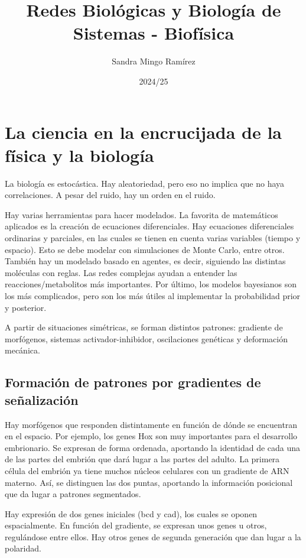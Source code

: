 \documentclass[nochap]{config/ejercicios}
\title{Redes Biológicas y Biología de Sistemas - Biofísica}
\author{Sandra Mingo Ramírez}
\date{2024/25}
\begin{document}
\maketitle

\tableofcontents

\newpage

\section{La ciencia en la encrucijada de la física y la biología}
La biología es estocástica. Hay aleatoriedad, pero eso no implica que no haya correlaciones. A pesar del ruido, hay un orden en el ruido. 

Hay varias herramientas para hacer modelados. La favorita de matemáticos aplicados es la creación de ecuaciones diferenciales. Hay ecuaciones diferenciales ordinarias y parciales, en las cuales se tienen en cuenta varias variables (tiempo y espacio). Esto se debe modelar con simulaciones de Monte Carlo, entre otros. También hay un modelado basado en agentes, es decir, siguiendo las distintas moléculas con reglas. Las redes complejas ayudan a entender las reacciones/metabolitos más importantes. Por último, los modelos bayesianos son los más complicados, pero son los más útiles al implementar la probabilidad prior y posterior. 

A partir de situaciones simétricas, se forman distintos patrones: gradiente de morfógenos, sistemas activador-inhibidor, oscilaciones genéticas y deformación mecánica. 

\subsection{Formación de patrones por gradientes de señalización}
Hay morfógenos que responden distintamente en función de dónde se encuentran en el espacio. Por ejemplo, los genes Hox son muy importantes para el desarrollo embrionario. Se expresan de forma ordenada, aportando la identidad de cada una de las partes del embrión que dará lugar a las partes del adulto. La primera célula del embrión ya tiene muchos núcleos celulares con un gradiente de ARN materno. Así, se distinguen las dos puntas, aportando la información posicional que da lugar a patrones segmentados. 

Hay expresión de dos genes iniciales (bcd y cad), los cuales se oponen espacialmente. En función del gradiente, se expresan unos genes u otros, regulándose entre ellos. Hay otros genes de segunda generación que dan lugar a la polaridad. 
\end{document}
